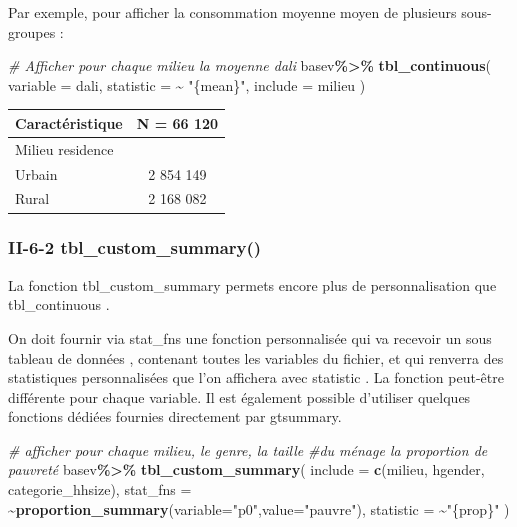 \documentclass[
]{article}
\newenvironment{Shaded}{\begin{snugshade}}{\end{snugshade}}
\newcommand{\AttributeTok}[1]{\textcolor[rgb]{0.13,0.29,0.53}{#1}}
\newcommand{\CommentTok}[1]{\textcolor[rgb]{0.56,0.35,0.01}{\textit{#1}}}
\newcommand{\FunctionTok}[1]{\textcolor[rgb]{0.13,0.29,0.53}{\textbf{#1}}}
\newcommand{\NormalTok}[1]{#1}
\newcommand{\SpecialCharTok}[1]{\textcolor[rgb]{0.81,0.36,0.00}{\textbf{#1}}}
\newcommand{\StringTok}[1]{\textcolor[rgb]{0.31,0.60,0.02}{#1}}
\begin{document}
Par exemple, pour afficher la consommation moyenne moyen de plusieurs
sous-groupes :

\begin{Shaded}
\begin{Highlighting}[]
\CommentTok{\# Afficher pour chaque milieu la moyenne dali}
\NormalTok{basev}\SpecialCharTok{\%\textgreater{}\%}
  \FunctionTok{tbl\_continuous}\NormalTok{(}
    \AttributeTok{variable =}\NormalTok{ dali,}
    \AttributeTok{statistic =} \SpecialCharTok{\textasciitilde{}} \StringTok{"\{mean\}"}\NormalTok{,}
    \AttributeTok{include =}\NormalTok{ milieu}
\NormalTok{  )}
\end{Highlighting}
\end{Shaded}

\begin{longtable}[]{@{}lc@{}}
\toprule\noalign{}
\textbf{Caractéristique} & \textbf{N = 66 120} \\
\midrule\noalign{}
\endhead
\bottomrule\noalign{}
\endlastfoot
Milieu residence & \\
Urbain & 2 854 149 \\
Rural & 2 168 082 \\
\end{longtable}

\hypertarget{ii-6-2-tbl_custom_summary}{%
\subsubsection{II-6-2
tbl\_custom\_summary()}\label{ii-6-2-tbl_custom_summary}}

La fonction tbl\_custom\_summary permets encore plus de personnalisation
que tbl\_continuous .

On doit fournir via stat\_fns une fonction personnalisée qui va recevoir
un sous tableau de données , contenant toutes les variables du fichier,
et qui renverra des statistiques personnalisées que l'on affichera avec
statistic . La fonction peut-être différente pour chaque variable. Il
est également possible d'utiliser quelques fonctions dédiées fournies
directement par gtsummary.

\begin{Shaded}
\begin{Highlighting}[]
\CommentTok{\# afficher pour chaque milieu, le genre, la taille }
\CommentTok{\#du ménage la proportion de pauvreté  }
\NormalTok{basev}\SpecialCharTok{\%\textgreater{}\%}
  \FunctionTok{tbl\_custom\_summary}\NormalTok{(}
  \AttributeTok{include =} \FunctionTok{c}\NormalTok{(milieu, hgender, categorie\_hhsize),}
  \AttributeTok{stat\_fns =} \SpecialCharTok{\textasciitilde{}}\FunctionTok{proportion\_summary}\NormalTok{(}\AttributeTok{variable=}\StringTok{"p0"}\NormalTok{,}\AttributeTok{value=}\StringTok{"pauvre"}\NormalTok{),}
  \AttributeTok{statistic =} \SpecialCharTok{\textasciitilde{}}\StringTok{"\{prop\}"}
\NormalTok{)}
\end{Highlighting}
\end{Shaded}
\end{document}
